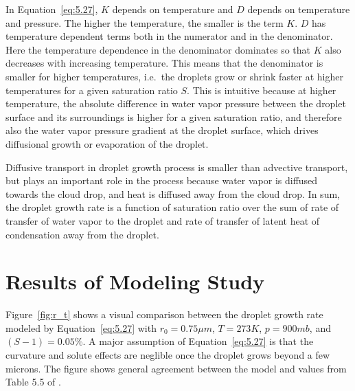 \documentclass[]{article}
\begin{document}
In Equation~\eqref{eq:5.27}, $K$ depends on temperature and $D$
depends on temperature and pressure. The higher the temperature, the smaller is
the term $K$. $D$ has temperature dependent terms both in the numerator and in
the denominator. Here the temperature dependence in the denominator dominates
so that $K$ also decreases with increasing temperature. This means that the
denominator is smaller for higher temperatures, i.e.\ the droplets grow or
shrink faster at higher temperatures for a given saturation ratio $S$. This is
intuitive because at higher temperature, the absolute difference in water vapor
pressure between the droplet surface and its surroundings is higher for a given
saturation ratio, and therefore also the water vapor pressure gradient at the droplet
surface, which drives diffusional growth or evaporation of the droplet.

Diffusive transport in droplet growth process is smaller than advective
transport, but plays an important role in the process because water vapor is
diffused towards the cloud drop, and heat is diffused away from the cloud drop.
In sum, the droplet growth rate is a function of saturation ratio over the sum
of rate of transfer of water vapor to the droplet and rate of transfer of
latent heat of condensation away from the droplet.


\section{Results of Modeling Study}
Figure~\ref{fig:r_t} shows a visual comparison between the droplet growth rate
modeled by Equation~\eqref{eq:5.27} with $r_0 = 0.75 \mu m$, $T=273 K$, $p=900
mb$, and $(S - 1) = 0.05\%$. A major assumption of Equation~\eqref{eq:5.27} is
that the curvature and solute effects are neglible once the droplet grows
beyond a few microns. The figure shows general agreement between the model and
values from Table 5.5 of \cite{Curry}.
\end{document}
